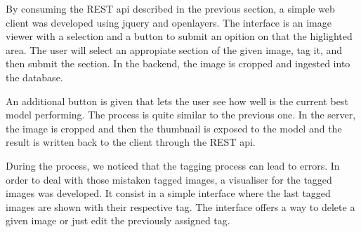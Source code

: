 By consuming the REST api described in the previous section, a simple web client was developed using jquery and openlayers. The interface is an image viewer with a selection and a button to submit an opition on that the higlighted area. The user will select an appropiate section of the given image, tag it, and then submit the section. In the backend, the image is cropped and ingested into the database.

\begin{figure}[h]
  \begin{center}
  \end{center}
\end{figure}

An additional button is given that lets the user see how well is the current best model performing. The process is quite similar to the previous one. In the server, the image is cropped and then the thumbnail is exposed to the model and the result is written back to the client through the REST api.

\begin{figure}[h]
  \begin{center}
  \end{center}
\end{figure}


\begin{figure}[h]
  \begin{center}
  \end{center}
\end{figure}

During the process, we noticed that the tagging process can lead to errors. In order to deal with those mistaken tagged images, a visualiser for the tagged images was developed. It consist in a simple interface where the last tagged images are shown with their respective tag. The interface offers a way to delete a given image or just edit the previously assigned tag.

